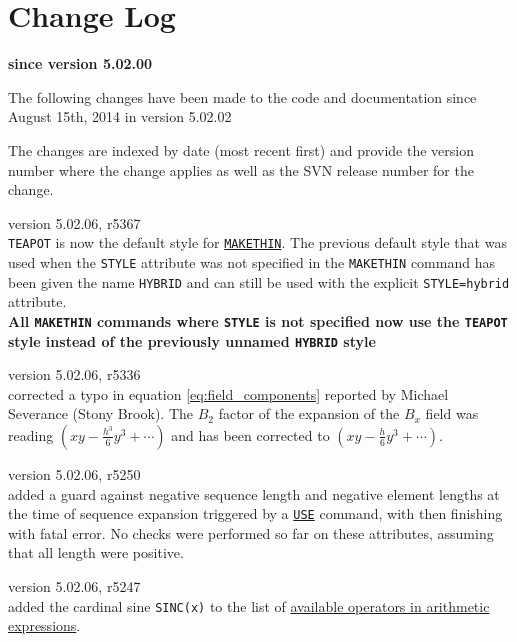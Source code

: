 \chapter*{Change Log}
\label{chap:changelog}

\begin{center} 
\textbf{since version 5.02.00}
\end{center}

The following changes have been made to the code and documentation since
August 15th, 2014 in version 5.02.02

The changes are indexed by date (most recent first) and provide the \madx 
version number where the change applies as well as the SVN 
release number for the change. 

\begin{madlist}
   version 5.02.06, r5367\\
  {\tt TEAPOT} is now the default style for 
  \hyperref[chap:makethin]{\tt MAKETHIN}. 
  The previous default style that was used when the {\tt STYLE} 
  attribute was not specified in the {\tt MAKETHIN} command 
  has been given the name {\tt HYBRID} 
  and can still be used with the explicit {\tt STYLE=hybrid} attribute. \\
  {\bf All {\tt MAKETHIN} commands where {\tt STYLE} is not specified now
  use the {\tt TEAPOT} style instead of the previously unnamed {\tt HYBRID} 
  style}

   version 5.02.06, r5336 \\
  corrected a typo in equation \ref{eq:field_components} 
  reported by Michael Severance (Stony Brook). 
  The $B_2$ factor of the expansion of the $B_x$ 
  field was reading $(xy - \frac{h^3}{6}y^3+\cdots)$ 
  and has been corrected to $(xy - \frac{h}{6}y^3+\cdots)$.


   version 5.02.06, r5250\\
  added a guard against negative sequence length and negative 
  element lengths at the time of sequence expansion triggered 
  by a \hyperref[sec:use]{\tt USE} command, with \madx then 
  finishing with fatal error. No checks were performed so far 
  on these attributes, assuming that all length were positive.

   version 5.02.06, r5247\\
  added the cardinal sine {\tt SINC(x)} to the list of 
  \hyperref[subsec:operator]{available operators in arithmetic 
  expressions}.


\end{madlist}

